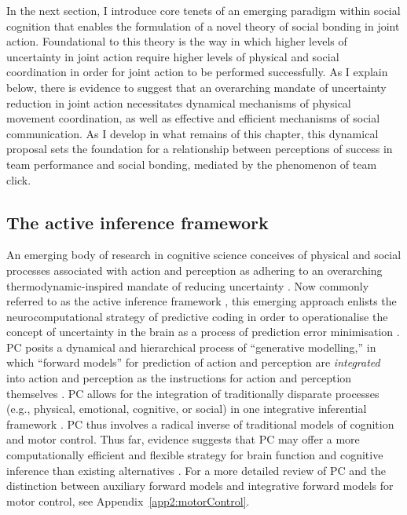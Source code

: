 \begin{CJK}{UTF8}{gbsn}
In the next section, I introduce core tenets of an emerging paradigm within social cognition that enables the formulation of a novel theory of social bonding in joint action. Foundational to this theory is the way in which higher levels of uncertainty in joint action require higher levels of physical and social coordination in order for joint action to be performed successfully.  As I explain below, there is evidence to suggest that an overarching mandate of uncertainty reduction in joint action necessitates dynamical mechanisms of physical movement coordination, as well as effective and efficient mechanisms of social communication.  As I develop in what remains of this chapter, this dynamical proposal sets the foundation for a relationship between perceptions of success in team performance and social bonding, mediated by the phenomenon of team click.


\subsection{The active inference framework\label{sect:AIF}}
An emerging body of research in cognitive science conceives of physical and social processes associated with action and perception as adhering to an overarching thermodynamic-inspired mandate of reducing uncertainty \citep[referred to as variational or information-theoretic ``free energy''][]{Friston2015}.  Now commonly referred to as the active inference framework \citep[hereafter AIF][]{Friston2006,Friston2010,Clark2015,Linson2018}, this emerging approach enlists the neurocomputational strategy of predictive coding \citep[hereafter PC; see][]{Rao1999} in order to operationalise the concept of uncertainty in the brain as a process of prediction error minimisation \citep{Clark2013}.  PC posits a dynamical and hierarchical process of ``generative modelling,'' in which ``forward models'' for prediction of action and perception are \textit{integrated} into action and perception as the instructions for action and perception themselves \citep[rather than being auxiliary to action and perception;][]{Pickering2014}.  PC allows for the integration of traditionally disparate processes (e.g., physical, emotional, cognitive, or social) in one integrative inferential framework \citep{Clark2015}.  PC thus involves a radical inverse of traditional models of cognition and motor control. Thus far, evidence suggests that PC may offer a more computationally efficient and flexible strategy for brain function and cognitive inference than existing alternatives \citep{Pickering2014,Clark2015a}.  For a more detailed review of PC and the distinction between auxiliary forward models and integrative forward models for motor control, see Appendix~\ref{app2:motorControl}.


\end{CJK}
